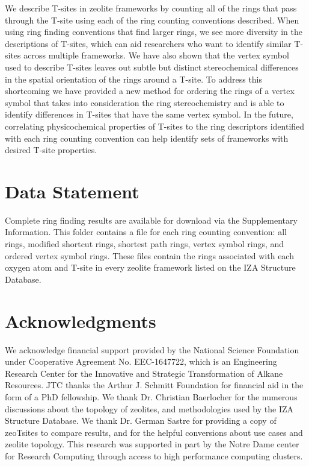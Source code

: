 \documentclass[preprint,numrefs,noinfo,sort&compress]{elsarticle}
\begin{document}
We describe T-sites in zeolite frameworks by counting all of the rings that pass through the T-site using each of the ring counting conventions described. When using ring finding conventions that find larger rings, we see more diversity in the descriptions of T-sites, which can aid researchers who want to identify similar T-sites across multiple frameworks. We have also shown that the vertex symbol used to describe T-sites leaves out subtle but distinct stereochemical differences in the spatial orientation of the rings around a T-site. To address this shortcoming we have provided a new method for ordering the rings of a vertex symbol that takes into consideration the ring stereochemistry and is able to identify differences in T-sites that have the same vertex symbol. In the future, correlating physicochemical properties of T-sites to the ring descriptors identified with each ring counting convention can help identify sets of frameworks with desired T-site properties. 

\section{Data Statement}
Complete ring finding results are available for download via the Supplementary Information. This folder contains a file for each ring counting convention: all rings, modified shortcut rings, shortest path rings, vertex symbol rings, and ordered vertex symbol rings. These files contain the rings associated with each oxygen atom and T-site in every zeolite framework listed on the IZA Structure Database. 

\section{Acknowledgments}
\label{sec:org5946b2f}

We acknowledge financial support provided by the National Science Foundation under Cooperative Agreement No. EEC-1647722, which is an Engineering Research Center for the Innovative and Strategic Transformation of Alkane Resources. JTC thanks the Arthur J. Schmitt Foundation for financial aid in the form of a PhD fellowship. We thank Dr. Christian Baerlocher for the numerous discussions about the topology of zeolites, and methodologies used by the IZA Structure Database. We thank Dr. German Sastre for providing a copy of zeoTsites to compare results, and for the helpful conversions about use cases and zeolite topology. This research was supported in part by the Notre Dame center for Research Computing through access to high performance computing clusters. 
\backmatter



\end{document}

